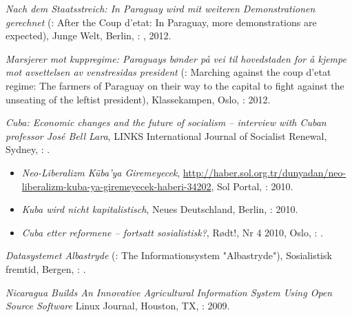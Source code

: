 \begin{itemize}
{\item \textit{Nach dem Staatsstreich: In Paraguay wird mit weiteren Demonstrationen gerechnet} (\english: After the Coup d'etat: In Paraguay, more demonstrations are expected), Junge Welt, Berlin, \Germany: , 2012.
\item \textit{Marsjerer mot kuppregime: Paraguays bønder på vei til hovedstaden for å kjempe mot avsettelsen av venstresidas president} (\english: Marching against the coup d'etat regime: The farmers of Paraguay on their way to the capital to fight against the unseating of the leftist president), Klassekampen, Oslo, \Norway:  2012.
\item \textit{Cuba: Economic changes and the future of socialism -- interview with Cuban professor José Bell Lara}, LINKS International Journal of Socialist Renewal, Sydney, \Australia: .
    \begin{itemize}
    \item \translatedversion \turkish \textit{Neo-Liberalizm Küba’ya Giremeyecek}, \href{http://haber.sol.org.tr/dunyadan/neo-liberalizm-kuba-ya-giremeyecek-haberi-34202}{http://haber.sol.org.tr/dunyadan/neo-liberalizm-kuba-ya-giremeyecek-haberi-34202}, Sol Portal, \Turkey:  2010.
    \item \translatedversion \german \textit{Kuba wird nicht kapitalistisch}, Neues Deutschland, Berlin, \Germany:  2010.
    \item \translatedversion \norwegian \textit{Cuba etter reformene – fortsatt sosialistisk?}, Rødt!, Nr 4 2010, Oslo, \Norway: .
    \end{itemize}
}
\item \textit{Datasystemet Albastryde} (\english: The Informationsystem "Albastryde"), Sosialistisk fremtid, Bergen, \Norway: .
\item \textit{Nicaragua Builds An Innovative Agricultural Information System Using Open Source Software} Linux Journal, Houston, TX, \USA:  2009.
\end{itemize}

